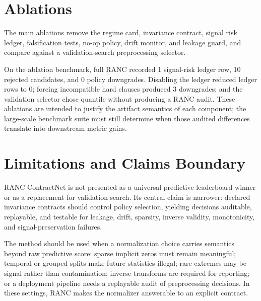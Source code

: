 \documentclass{article}
\newcommand{\inputrepoartifact}[1]{%
  \IfFileExists{../../#1}{%
  }{%
  }%
}
\begin{document}
\FloatBarrier

\section{Ablations}

The main ablations remove the regime card, invariance contract, signal risk
ledger, falsification tests, no-op policy, drift monitor, and leakage guard, and
compare against a validation-search preprocessing selector.

\begin{table}[H]
\centering
\caption{Ablation evidence on the outlier-noise smoke benchmark. The takeaway is
that RANC components leave observable traces: removing the ledger removes ledger
rows, incompatible hard clauses trigger downgrades, removing outlier damping
changes selected policies, and the validation selector produces no RANC audit.}
\label{tab:ablations}
\resizebox{\linewidth}{!}{\inputrepoartifact{outputs/ablations/ablation_table.tex}}
\end{table}

On the ablation benchmark, full RANC recorded 1 signal-risk ledger row, 10
rejected candidates, and 0 policy downgrades. Disabling the ledger reduced
ledger rows to 0; forcing incompatible hard clauses produced 3 downgrades; and
the validation selector chose quantile without producing a RANC audit. These
ablations are intended to justify the artifact semantics of each component; the
large-scale benchmark suite must still determine when those audited differences
translate into downstream metric gains.

\FloatBarrier

\section{Limitations and Claims Boundary}
\label{sec:limits}

RANC-ContractNet is not presented as a universal predictive leaderboard winner
or as a replacement for validation search. Its central claim is narrower:
declared invariance contracts should control policy selection, yielding decisions
auditable, replayable, and testable for leakage, drift, sparsity, inverse
validity, monotonicity, and signal-preservation failures.

The method should be used when a normalization choice carries semantics beyond
raw predictive score: sparse implicit zeros must remain meaningful; temporal or
grouped splits make future statistics illegal; rare extremes may be signal
rather than contamination; inverse transforms are required for reporting; or a
deployment pipeline needs a replayable audit of preprocessing decisions. In
these settings, RANC makes the normalizer answerable to an explicit contract.
\end{document}
